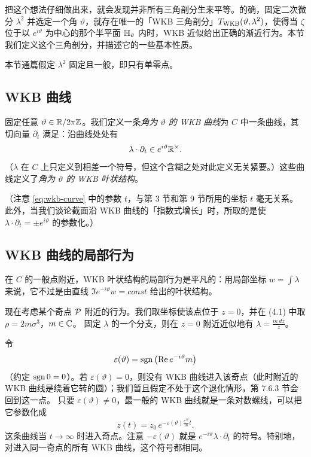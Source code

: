 把这个想法仔细做出来，就会发现并非所有三角剖分生来平等。的确，固定二次微分 $\lambda^2$ 并选定一个角 $\vartheta$，就存在唯一的「WKB 三角剖分」$T_{\rm WKB}(\vartheta, \lambda^2)$，使得当 $\zeta$ 位于以 $e^{i\vartheta}$ 为中心的那个半平面 ${\mathbb{H}}_\vartheta$ 内时，WKB 近似给出正确的渐近行为。本节我们定义这个三角剖分，并描述它的一些基本性质。

本节通篇假定 $\lambda^2$ 固定且一般，即只有单零点。

\subsection{WKB 曲线}

固定任意 $\vartheta \in \mathbb{R}/2\pi\mathbb{Z}$。我们定义一条\emph{角为 $\vartheta$ 的 WKB 曲线}为 $C$ 中一条曲线，其切向量 $\partial_t$ 满足：沿曲线处处有
\begin{equation} \label{eq:wkb-curve}
\lambda \cdot \partial_t \in e^{i\vartheta} \mathbb{R}^\times .
\end{equation}
（$\lambda$ 在 $C$ 上只定义到相差一个符号，但这个含糊之处对此定义无关紧要。）这些曲线定义了\emph{角为 $\vartheta$ 的 WKB 叶状结构}。

（注意 \eqref{eq:wkb-curve} 中的参数 $t$，与第 3 节和第 9 节所用的坐标 $t$ 毫无关系。%
此外，当我们谈论截面沿 WKB 曲线的「指数式增长」时，所取的是使 $\lambda \cdot \partial_t = \pm e^{i\vartheta}$ 的参数化。）

\subsection{WKB 曲线的局部行为} \label{sec:wkb-local}

在 $C$ 的一般点附近，WKB 叶状结构的局部行为是平凡的：用局部坐标 $w = \int \lambda$ 来说，它不过是由直线 $\Im e^{-i\vartheta} w = const$ 给出的叶状结构。

现在考虑某个奇点 $\mathcal{P}$ 附近的行为。我们取坐标使该点位于 $z=0$，并在 (4.1) 中取 $\rho = 2m\sigma^3$，$m \in \mathbb{C}$。%
固定 $\lambda$ 的一个分支，则在 $z=0$ 附近近似地有 $\lambda = \frac{m\,dz}{z}$。

令
\begin{equation} \label{eq:defeps}
\varepsilon(\vartheta) = \operatorname{sgn} \left( \operatorname{Re} e^{-i\vartheta} m \right)
\end{equation}
（约定 $\operatorname{sgn} 0 = 0$）。若 $\varepsilon(\vartheta) = 0$，则没有 WKB 曲线进入该奇点（此时附近的 WKB 曲线是绕着它转的圆）；我们暂且假定不处于这个退化情形，第 7.6.3 节会回到这一点。%
只要 $\varepsilon(\vartheta) \neq 0$，最一般的 WKB 曲线就是一条对数螺线，可以把它参数化成
\begin{equation} \label{eq:log-spiral}
z(t) = z_0\, e^{- \varepsilon(\vartheta) \frac{e^{i\vartheta}}{m} t}.
\end{equation}
这条曲线当 $t \to \infty$ 时进入奇点。注意 $-\varepsilon(\vartheta)$ 就是 $e^{-i\vartheta}\lambda \cdot \partial_t$ 的符号。特别地，对进入同一奇点的所有 WKB 曲线，这个符号都相同。

